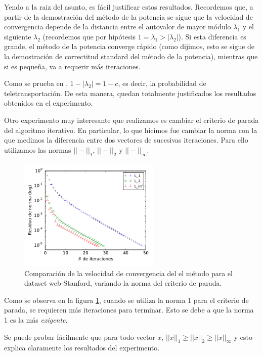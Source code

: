 Yendo a la raiz del asunto, es fácil justificar estos resultados. Recordemos que, a partir de la demostración del m\'etodo de la potencia se sigue que la velocidad de convergencia depende de la distancia entre el autovalor de mayor módulo $\lambda_1$ y el siguiente $\lambda_2$ (recordemos que por hipótesis $1 = \lambda_1 > |\lambda_2|$). 
Si esta diferencia es grande, el m\'etodo de la potencia converge rápido (como dijimos, esto se sigue de la demostración de correctitud standard del m\'etodo de la potencia), mientras que si es pequeña, va a requerir más iteraciones.

Como se prueba en \cite{Havel}, $1 - |\lambda_2| = 1 - c$, es decir, la probabilidad de teletransportación. De esta manera, quedan totalmente justificados los resultados obtenidos en el experimento.


Otro experimento muy interesante que realizamos es cambiar el criterio de parada del algoritmo iterativo. En particular, lo que hicimos fue cambiar la norma con la que medimos la diferencia entre dos vectores de sucesivas iteraciones. Para ello utilizamos las normas $||-||_1$, $||-||_2$ y $||-||_{\infty}$.

\begin{figure}[H]
\centering

    \includegraphics[width=0.6\textwidth]{imgs/norma-convergencia.pdf}
  \caption{\footnotesize{Comparación de la velocidad de convergencia del el método para el dataset web-Stanford, variando la norma del criterio de parada.}}
  \label{fig:conv-norma}
\end{figure}

Como se observa en la figura \ref{fig:conv-norma}, cuando se utiliza la norma 1 para el criterio de parada, se requieren más iteraciones para terminar. Esto se debe a que la norma 1 es la más \emph{exigente}. 

Se puede probar fácilmente que para todo vector $x$, $||x||_1 \geq ||x||_2 \geq ||x||_{\infty}$ y esto explica claramente los resultados del experimento.




